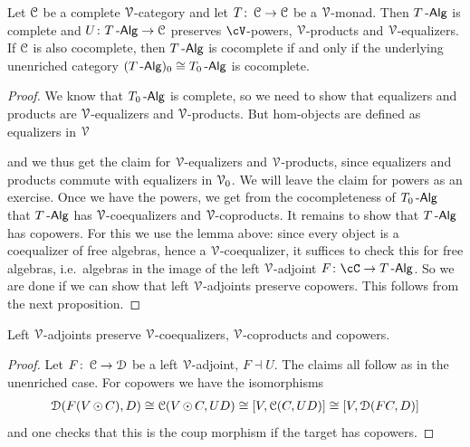 \documentclass[a4paper,11pt,oneside,openany]{scrbook}
\begin{document}
\begin{thm}
	Let $\C$ be a complete $\V$-category and let $T \from \C \to \C$ be a
    $\V$-monad. Then $T\Alg$ is complete and $U \from T\Alg \to \C$ preserves
    $\cV$-powers, $\V$-products and $\V$-equalizers. If $\C$ is also cocomplete,
    then $T\Alg$ is cocomplete if and only if the underlying unenriched category
    $(T\Alg)_{0}\iso T_{0}\Alg$ is cocomplete.
\end{thm}

\begin{proof}
	We know that $T_{0}\Alg$ is complete, so we need to show that equalizers and products are $\V$-equalizers and $\V$-products. But hom-objects are
	defined as equalizers in $\V$
	\begin{center}
	\end{center}
	and we thus get the claim for $\V$-equalizers and $\V$-products, since
    equalizers and products commute with equalizers in $\V_{0}$. We will leave
    the claim for powers as an exercise. Once we have the powers, we get from
    the cocompleteness of $T_{0}\Alg$ that $T\Alg$ has $\V$-coequalizers and
    $\V$-coproducts. It remains to show that $T\Alg$ has copowers. For this we
    use the lemma above: since every object is a coequalizer of free
	algebras, hence a $\V$-coequalizer, it suffices to check this for free
    algebras, i.e.\ algebras in the image of the left $\V$-adjoint $F\from\cC\to
    T\Alg$. So we are done if we can show that left $\V$-adjoints preserve
    copowers. This follows from the next proposition.
\end{proof}

\begin{prop}
	Left $\V$-adjoints preserve $\V$-coequalizers, $\V$-coproducts and copowers.
\end{prop}

\begin{proof}
	Let $F \from \C \to \D$ be a left $\V$-adjoint, $F\dashv U$. The claims all follow as in the unenriched case. For copowers we have the isomorphisms
	\begin{align*}
		\D(F(V\copw C),D) \iso \C(V\copw C,UD) \iso \lbrack V,\C(C,UD) \rbrack \iso \lbrack V,\D(FC,D) \rbrack
	\end{align*}
	and one checks that this is the coup morphism if the target has copowers.
\end{proof}
\end{document}
